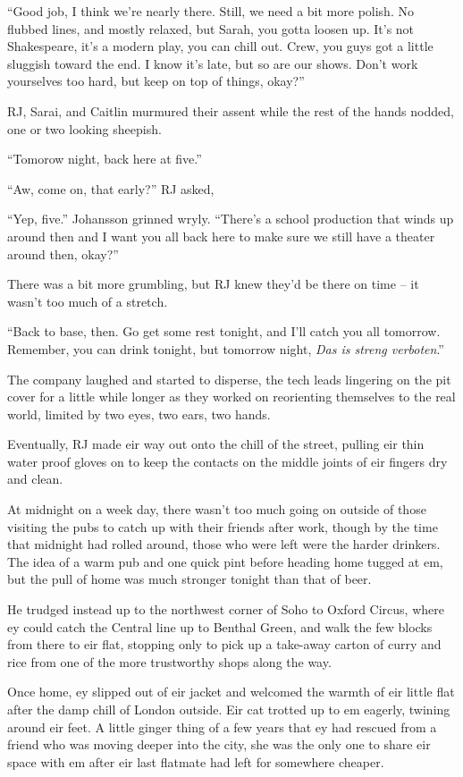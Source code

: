 ``Good job, I think we're nearly there.  Still, we need a bit more polish.  No flubbed lines, and mostly relaxed, but Sarah, you gotta loosen up.  It's not Shakespeare, it's a modern play, you can chill out.  Crew, you guys got a little sluggish toward the end.  I know it's late, but so are our shows.  Don't work yourselves too hard, but keep on top of things, okay?''

RJ, Sarai, and Caitlin murmured their assent while the rest of the hands nodded, one or two looking sheepish.

``Tomorow night, back here at five.''

``Aw, come on, that early?'' RJ asked,

``Yep, five.''  Johansson grinned wryly.  ``There's a school production that winds up around then and I want you all back here to make sure we still have a theater around then, okay?''

There was a bit more grumbling, but RJ knew they'd be there on time -- it wasn't too much of a stretch.

``Back to base, then.  Go get some rest tonight, and I'll catch you all tomorrow.  Remember, you can drink tonight, but tomorrow night, \textit{Das is streng verboten}.''

The company laughed and started to disperse, the tech leads lingering on the pit cover for a little while longer as they worked on reorienting themselves to the real world, limited by two eyes, two ears, two hands.

Eventually, RJ made eir way out onto the chill of the street, pulling eir thin water proof gloves on to keep the contacts on the middle joints of eir fingers dry and clean.

At midnight on a week day, there wasn't too much going on outside of those visiting the pubs to catch up with their friends after work, though by the time that midnight had rolled around, those who were left were the harder drinkers.  The idea of a warm pub and one quick pint before heading home tugged at em, but the pull of home was much stronger tonight than that of beer.

He trudged instead up to the northwest corner of Soho to Oxford Circus, where ey could catch the Central line up to Benthal Green, and walk the few blocks from there to eir flat, stopping only to pick up a take-away carton of curry and rice from one of the more trustworthy shops along the way.

Once home, ey slipped out of eir jacket and welcomed the warmth of eir little flat after the damp chill of London outside.  Eir cat trotted up to em eagerly, twining around eir feet.  A little ginger thing of a few years that ey had rescued from a friend who was moving deeper into the city, she was the only one to share eir space with em after eir last flatmate had left for somewhere cheaper.

